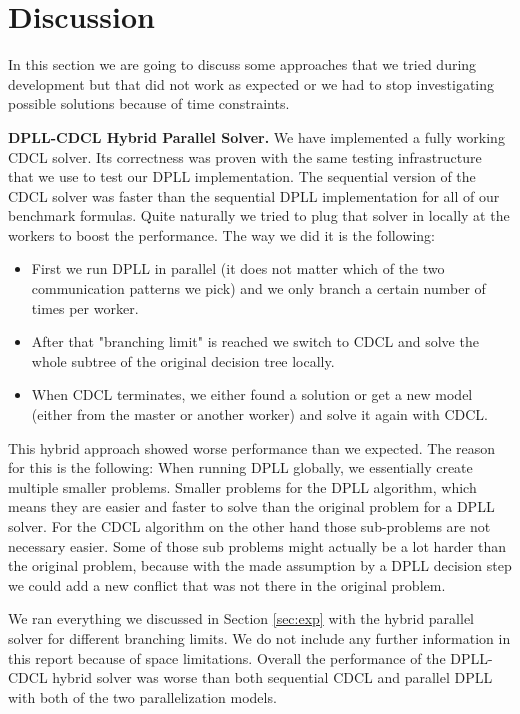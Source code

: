 \documentclass[letterpaper]{article}
\newcommand{\mypar}[1]{{\bf #1.}}
\begin{document}
\section{Discussion}\label{sec:discussion}
In this section we are going to discuss some approaches that we tried during development but that did not work as expected or we had to stop investigating possible solutions because of time constraints.

\mypar{DPLL-CDCL Hybrid Parallel Solver}
We have implemented a fully working CDCL solver.
Its correctness was proven with the same testing infrastructure that we use to test our DPLL implementation.
The sequential version of the CDCL solver was faster than the sequential DPLL implementation for all of our benchmark formulas.
Quite naturally we tried to plug that solver in locally at the workers to boost the performance.
The way we did it is the following:
\begin{itemize}
    \item First we run DPLL in parallel (it does not matter which of the two communication patterns we pick) and we only branch a certain number of times per worker.
    \item After that "branching limit" is reached we switch to CDCL and solve the whole subtree of the original decision tree locally.
    \item When CDCL terminates, we either found a solution or get a new model (either from the master or another worker) and solve it again with CDCL.
\end{itemize}
This hybrid approach showed worse performance than we expected.
The reason for this is the following:
When running DPLL globally, we essentially create multiple smaller problems.
Smaller problems for the DPLL algorithm, which means they are easier and faster to solve than the original problem for a DPLL solver.
For the CDCL algorithm on the other hand those sub-problems are not necessary easier.
Some of those sub problems might actually be a lot harder than the original problem,
because with the made assumption by a DPLL decision step we could add a new conflict that was not there in the original problem.

We ran everything we discussed in Section \ref{sec:exp} with the hybrid parallel solver for different branching limits.
We do not include any further information in this report because of space limitations.
Overall the performance of the DPLL-CDCL hybrid solver was worse than both sequential CDCL and parallel DPLL with both of the two parallelization models.
\end{document}

